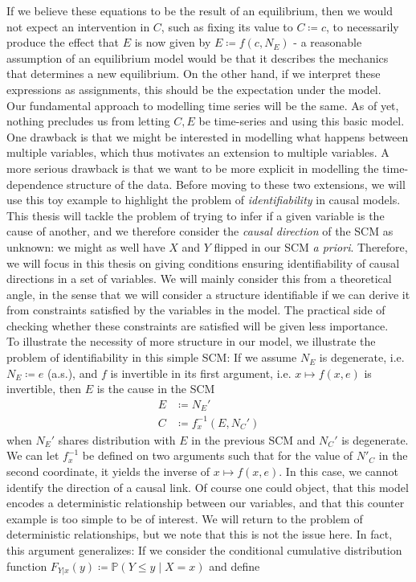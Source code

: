 \documentclass[11pt, a4paper]{memoir}
\theoremstyle{break}
\theoremstyle{break}
\theoremstyle{nonumberplain}
\newcommand{\mP}{\mathbb{P}}
\begin{document}
If we believe these equations to be the result of an equilibrium, then we would not expect an intervention in $C$, such as fixing its value to $C\coloneqq c$, to necessarily produce the effect that $E$ is now given by $E\coloneqq f(c,N_E)$ - a reasonable assumption of an equilibrium model would be that it describes the mechanics that determines a new equilibrium. On the other hand, if we interpret these expressions as assignments, this should be the expectation under the model.\\[5pt]
Our fundamental approach to modelling time series will be the same. As of yet, nothing precludes us from letting $C,E$ be time-series and using this basic model. One drawback is that we might be interested in modelling what happens between multiple variables, which thus motivates an extension to multiple variables. A more serious drawback is that we want to be more explicit in modelling the time-dependence structure of the data. Before moving to these two extensions, we will use this toy example to highlight the problem of \emph{identifiability} in causal models. This thesis will tackle the problem of trying to infer if a given variable is the cause of another, and we therefore consider the \emph{causal direction} of the SCM as unknown: we might as well have $X$ and $Y$ flipped in our SCM \emph{a priori}. Therefore, we will focus in this thesis on giving conditions ensuring identifiability of causal directions in a set of variables. We will mainly consider this from a theoretical angle, in the sense that we will consider a structure identifiable if we can derive it from constraints satisfied by the variables in the model. The practical side of checking whether these constraints are satisfied will be given less importance.\\[5pt]
To illustrate the necessity of more structure in our model, we illustrate the problem of identifiability in this simple SCM: If we assume $N_E$ is degenerate, i.e. $N_E\coloneqq e$ (a.s.), and $f$ is invertible in its first argument, i.e. $x\mapsto f(x,e)$ is invertible, then $E$ is the cause in the SCM
\begin{align*}
E&\coloneqq N_E'\\
C&\coloneqq f_x^{-1}(E,N_C')
\end{align*}
when $N_E'$ shares distribution with $E$ in the previous SCM and $N_C'$ is degenerate.  We can let $f_x^{-1}$ be defined on two arguments such that for the value of $N'_C$ in the second coordinate, it yields the inverse of $x\mapsto f(x,e)$. In this case, we cannot  identify the direction of a causal link. Of course one could object, that this model encodes a deterministic relationship between our variables, and that this counter example is too simple to be of interest. We will return to the problem of deterministic relationships, but we note that this is not the issue here. In fact, this argument generalizes: If we consider the conditional cumulative distribution function $F_{Y|x}(y)\coloneqq \mP(Y\leqslant y\mid X=x)$ and define
\end{document}
